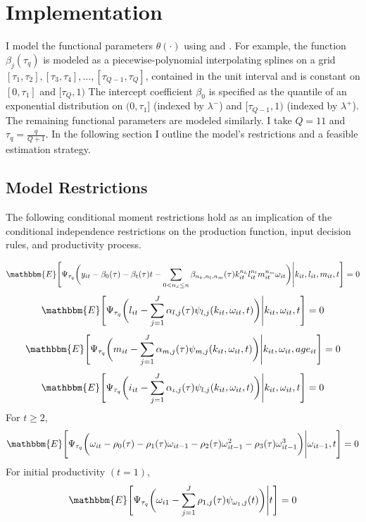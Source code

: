 \documentclass{article}
\begin{document}
\section{Implementation}
I model the functional parameters $\theta(\cdot)$ using \cite{Wei2009} and \cite{Arellano2016}. For example, the function $\beta_{j}(\tau_{q})$ is modeled as a piecewise-polynomial interpolating splines on a grid $[\tau_{1},\tau_{2}], [\tau_{3},\tau_{4}],\dots, [\tau_{Q-1},\tau_{Q}]$, contained in the unit interval and is constant on $[0, \tau_{1}]$ and $[\tau_{Q}, 1)$ The intercept coefficient $\beta_{0}$ is specified as the quantile of an exponential distribution on $(0,\tau_{1}]$ (indexed by $\lambda^{-}$) and $[\tau_{Q-1}, 1)$ (indexed by $\lambda^{+}$). The remaining functional parameters are modeled similarly. I take $Q=11$ and $\tau_{q}=\frac{q}{Q+1}$. In the following section I outline the model's restrictions and a feasible estimation strategy.

\subsection{Model Restrictions}
The following conditional moment restrictions hold as an implication of the conditional independence restrictions on the production function, input decision rules, and productivity process.

\begin{equation}\label{ymoment}
\mathbbm{E}\Bigg[\Psi_{\tau_{q}}\bigg(y_{it}-\beta_{0}(\tau)-\beta_{t}(\tau)t-\sum_{0<n_{x}\leq n}\beta_{n_{k}, n_{l}, n_{m}}(\tau)k_{it}^{n_{k}}l^{n_{l}}_{it}m^{n_{m}}_{it}\omega_{it}\bigg)\Bigg|k_{it}, l_{it}, m_{it}, t\Bigg]=0
\end{equation}
\begin{equation}\label{lmoment}
\mathbbm{E}\Bigg[\Psi_{\tau_{q}}\bigg(l_{it}-\sum_{j=1}^{J}\alpha_{l,j}(\tau)\psi_{l,j}(k_{it}, \omega_{it}, t)\bigg)\Bigg|k_{it}, \omega_{it}, t\Bigg]=0
\end{equation}
\begin{equation}\label{mmoment}
\mathbbm{E}\Bigg[\Psi_{\tau_{q}}\bigg(m_{it}-\sum_{j=1}^{J}\alpha_{m,j}(\tau)\psi_{m,j}(k_{it}, \omega_{it}, t)\bigg)\Bigg|k_{it}, \omega_{it}, age_{it}\Bigg]=0
\end{equation}
\begin{equation}\label{imoment}
\mathbbm{E}\Bigg[\Psi_{\tau_{q}}\bigg(i_{it}-\sum_{j=1}^{J}\alpha_{\iota,j}(\tau)\psi_{l,j}(k_{it}, \omega_{it}, t)\bigg)\Bigg|k_{it}, \omega_{it}, t\Bigg]=0
\end{equation}
For $t\geq 2$,
\begin{equation}\label{omegamoment}
\mathbbm{E}\Bigg[\Psi_{\tau_{q}}\bigg(\omega_{it}-\rho_{0}(\tau)-\rho_{1}(\tau)\omega_{it-1}-\rho_{2}(\tau)\omega^{2}_{it-1}-\rho_{3}(\tau)\omega^{3}_{it-1}\bigg)\Bigg|\omega_{it-1}, t\Bigg]=0
\end{equation}
For initial productivity $(t=1)$,
\begin{equation}\label{omega1qmoment}
\mathbbm{E}\Bigg[\Psi_{\tau_{q}}\bigg(\omega_{i1}-\sum_{j=1}^{J}\rho_{1,j}(\tau)\psi_{\omega_{1},j}(t)\bigg)\Bigg|t\Bigg]=0
\end{equation}
\end{document}
